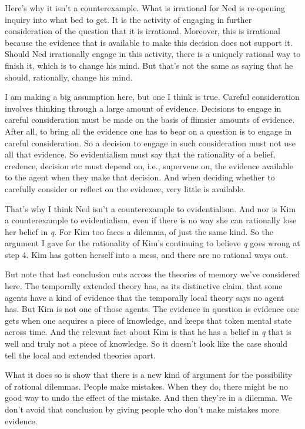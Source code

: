 \documentclass[
  11pt,
  letterpaper,
  DIV=11,
  numbers=noendperiod,
  twoside]{scrartcl}
\begin{document}
Here's why it isn't a counterexample. What is irrational for Ned is
re-opening inquiry into what bed to get. It is the activity of engaging
in further consideration of the question that it is irrational.
Moreover, this is irrational because the evidence that is available to
make this decision does not support it. Should Ned irrationally engage
in this activity, there is a uniquely rational way to finish it, which
is to change his mind. But that's not the same as saying that he should,
rationally, change his mind.

I am making a big assumption here, but one I think is true. Careful
consideration involves thinking through a large amount of evidence.
Decisions to engage in careful consideration must be made on the basis
of flimsier amounts of evidence. After all, to bring all the evidence
one has to bear on a question is to engage in careful consideration. So
a decision to engage in such consideration must not use all that
evidence. So evidentialism must say that the rationality of a belief,
credence, decision etc must depend on, i.e., supervene on, the evidence
available to the agent when they make that decision. And when deciding
whether to carefully consider or reflect on the evidence, very little is
available.

That's why I think Ned isn't a counterexample to evidentialism. And nor
is Kim a counterexample to evidentialism, even if there is no way she
can rationally lose her belief in \emph{q}. For Kim too faces a dilemma,
of just the same kind. So the argument I gave for the rationality of
Kim's continuing to believe \emph{q} goes wrong at step 4. Kim has
gotten herself into a mess, and there are no rational ways out.

But note that last conclusion cuts across the theories of memory we've
considered here. The temporally extended theory has, as its distinctive
claim, that some agents have a kind of evidence that the temporally
local theory says no agent has. But Kim is not one of those agents. The
evidence in question is evidence one gets when one acquires a piece of
knowledge, and keeps that token mental state across time. And the
relevant fact about Kim is that he has a belief in \emph{q} that is well
and truly not a piece of knowledge. So it doesn't look like the case
should tell the local and extended theories apart.

What it does so is show that there is a new kind of argument for the
possibility of rational dilemmas. People make mistakes. When they do,
there might be no good way to undo the effect of the mistake. And then
they're in a dilemma. We don't avoid that conclusion by giving people
who don't make mistakes more evidence.
\end{document}
